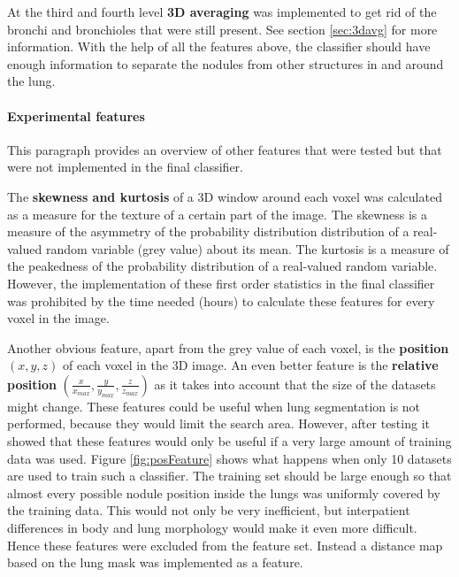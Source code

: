 At the third and fourth level \textbf{3D averaging} was implemented to get rid
of the bronchi and bronchioles that were still present. See section
\ref{sec:3davg} for more information. With the help of all the features above,
the classifier should have enough information to separate the nodules from other
structures in and around the lung.

\paragraph{Experimental features}
This paragraph provides an overview of other features that were
tested but that were not implemented in the final classifier.

The \textbf{skewness and kurtosis} of a 3D window around each
voxel was calculated as a measure for the texture of a certain part of the image. The
skewness is a measure of the asymmetry of the probability distribution
distribution of a real-valued random variable (grey value) about its mean. The
kurtosis is a measure of the peakedness of the probability distribution of a
real-valued random variable. However, the implementation of these first order
statistics in the final classifier was prohibited by the time needed (hours) to
calculate these features for every voxel in the image.

Another obvious feature, apart from the grey value of each voxel, is the
\textbf{position} $(x, y, z)$ of each voxel in the 3D image. An even better
feature is the \textbf{relative position} $(\tfrac{x}{x_{max}},
\tfrac{y}{y_{max}}, \tfrac{z}{z_{max}})$ as it takes into account that the size
of the datasets might change. These features could be useful when lung
segmentation is not performed, because they would limit the search area.
However, after testing it showed that these features would only be useful if a
very large amount of training data was used. Figure \ref{fig:posFeature} shows
what happens when only 10 datasets are used to train such a classifier. The
training set should be large enough so that almost every possible nodule
position inside the lungs was uniformly covered by the training data. This would
not only be very inefficient, but interpatient differences in body and lung
morphology would make it even more difficult. Hence these features were excluded
from the feature set. Instead a distance map based on the lung mask was
implemented as a feature.


